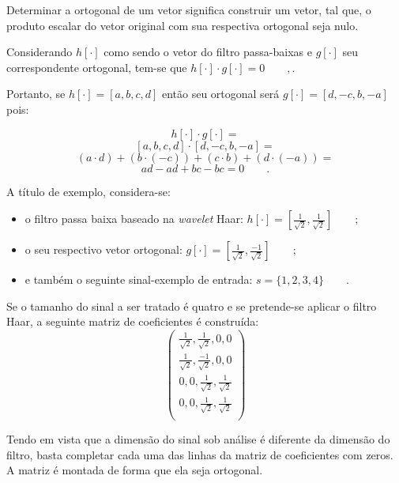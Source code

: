 			\par Determinar a ortogonal de um vetor significa construir um vetor, tal que, o produto escalar do vetor original com sua respectiva ortogonal seja nulo.
			
			\par Considerando $h[\cdot]$ como sendo o vetor do filtro passa-baixas e $g[\cdot]$ seu correspondente ortogonal, tem-se que $h[\cdot] \cdot g[\cdot] = 0\qquad,$.
			\par Portanto, se $h[\cdot]=[a, b, c, d]$ então seu ortogonal será $g[\cdot]=[d, -c, b, -a]$ pois:
			
			$$
				h[\cdot] \cdot g[\cdot]  =
			$$
			$$
			    [a, b, c, d] \cdot [d, -c, b, -a] = 
			$$
			$$
				(a \cdot d) + (b \cdot (-c)) + (c \cdot b) + (d \cdot (-a)) = 
			$$
			$$
				ad - ad + bc - bc = 0 \qquad.
			$$

			\par A título de exemplo, considera-se:
			\begin{itemize}
				\item o filtro passa baixa baseado na \textit{wavelet} Haar: $h[\cdot] = [\frac{1}{\sqrt{2}}, \frac{1}{\sqrt{2}}]\qquad;$
				\item o seu respectivo vetor ortogonal: $g[\cdot] = [\frac{1}{\sqrt{2}}, \frac{-1}{\sqrt{2}}]\qquad;$
				\item e também o seguinte sinal-exemplo de entrada: $s = \{1,2,3,4\}\qquad.$
			\end{itemize}

			\par Se o tamanho do sinal a ser tratado é quatro e se pretende-se aplicar o filtro Haar, a seguinte matriz de coeficientes é construída:
			\begin{equation}
				\begin{pmatrix}
					\frac{1}{\sqrt{2}}, \frac{1}{\sqrt{2}}, 0, 0\\
					\frac{1}{\sqrt{2}}, \frac{-1}{\sqrt{2}}, 0, 0\\
					0, 0, \frac{1}{\sqrt{2}}, \frac{1}{\sqrt{2}}\\
					0, 0, \frac{1}{\sqrt{2}}, \frac{1}{\sqrt{2}}\\
					\label{eq:haarFilters}
				\end{pmatrix} 
			\end{equation}
			\par Tendo em vista que a dimensão do sinal sob análise é diferente da dimensão do filtro, basta completar cada uma das linhas da matriz de coeficientes com zeros. A matriz é montada de forma que ela seja ortogonal.

